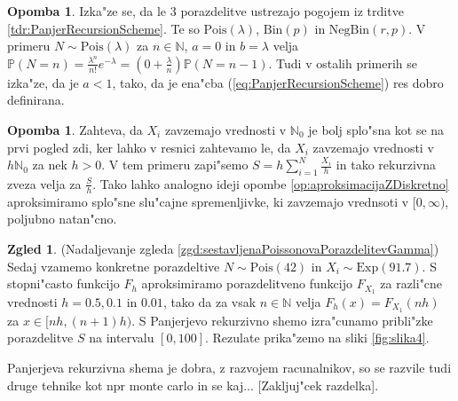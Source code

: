 \documentclass[12pt, a4paper, reqno]{amsart}
\theoremstyle{definition}
\newtheorem{zgled}[definicija]{Zgled}
\newtheorem{opomba}[definicija]{Opomba}
\theoremstyle{plain}
\newcommand{\N}{\mathbb{N}}
\newcommand{\Prob}{\mathbb{P}}
\newcommand{\1}{\mathds{1}}
\newcommand{\Pois}[1]{\text{Pois}(#1)}
\begin{document}
    \begin{opomba}
        Izka"ze se, da le $3$ porazdelitve 
        ustrezajo pogojem iz trditve \ref{tdr:PanjerRecursionScheme}. Te so $\Pois{\lambda}$, $\text{Bin}(p)$ in
        $\text{NegBin}(r, p)$. V primeru $N\sim\Pois{\lambda}$ za $n\in\N$, $a = 0$ in $b = \lambda$ velja $\Prob\left(N = n\right) = \frac{\lambda^n}{n!}e^{-\lambda} = 
        \left(0 + \frac{\lambda}{n}\right)\Prob\left(N = n - 1\right)$. Tudi v ostalih primerih se izka"ze, da je $a < 1$, tako, da je 
        ena"cba (\ref{eq:PanjerRecursionScheme}) res dobro definirana.
    \end{opomba}

    \begin{opomba}
        Zahteva, da $X_i$ zavzemajo vrednosti v $\N_0$ je bolj splo"sna kot se na prvi pogled zdi, ker
        lahko v resnici zahtevamo le, da $X_i$ zavzemajo vrednosti v $h\N_0$ za nek $h>0$. V tem primeru 
        zapi"semo $S = h\sum_{i=1}^N\frac{X_i}{h}$ in tako rekurzivna zveza velja za $\frac{S}{h}$. 
        Tako lahko analogno ideji opombe \ref{op:aproksimacijaZDiskretno} aproksimiramo splo"sne slu"cajne 
        spremenljivke, ki zavzemajo vrednsoti v $[0, \infty)$, poljubno natan"cno.
    \end{opomba}  

    \begin{zgled}(Nadaljevanje zgleda \ref{zgd:sestavljenaPoissonovaPorazdelitevGamma}) Sedaj vzamemo 
        konkretne porazdeltive $N\sim\Pois{42}$ in $X_i\sim\text{Exp}(91.7)$. S stopni"casto funkcijo 
        $F_h$ aproksimiramo porazdelitveno funkcijo $F_{X_1}$ za razli"cne vrednosti $h = 0.5, 0.1$ in $0.01$, 
        tako da za vsak $n\in\N$ velja $F_h(x) = F_{X_1}(nh)$ za $x\in\bigl[nh, (n+1)h\bigr)$. 
        S Panjerjevo rekurzivno shemo izra"cunamo pribli"zke porazdelitve $S$ na intervalu $[0, 100]$.
        Rezulate prika"zemo na sliki \ref{fig:slika4}.
 
        
        \label{zgd:PanjerExp}
    \end{zgled}

    Panjerjeva rekurzivna shema je dobra, z razvojem racunalnikov, so se razvile tudi druge tehnike kot npr 
    monte carlo in se kaj... [Zakljuj"cek razdelka].
\end{document}
